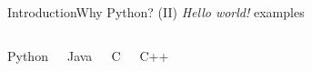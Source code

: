 \documentclass[10pt,compress]{beamer} %
\begin{document}
\begin{frame}[plain]{Introduction}{Why Python? (II)}
\centering \textit{Hello world!} examples
    \begin{columns}
		\vspace{-0.2cm}
		\begin{block}{Python}
		\vspace{-0.2cm}
			
		\end{block}

		\vspace{-0.2cm}
		\begin{block}{Java}
		\vspace{-0.2cm}
			
		\end{block}

		\vspace{-0.2cm}
		\begin{block}{C}
		\vspace{-0.2cm}
			
		\end{block}

		\vspace{-0.2cm}
		\begin{block}{C++}
		\vspace{-0.2cm}
			
		\end{block}
	\end{columns}

\end{frame}
\end{document}
